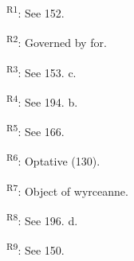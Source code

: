 \textsuperscript{R1}: See 152.

\textsuperscript{R2}: Governed by for.

\textsuperscript{R3}: See 153. c.

\textsuperscript{R4}: See 194. b.

\textsuperscript{R5}: See 166.

\textsuperscript{R6}: Optative (130).

\textsuperscript{R7}: Object of wyrceanne.

\textsuperscript{R8}: See 196. d.

\textsuperscript{R9}: See 150.

